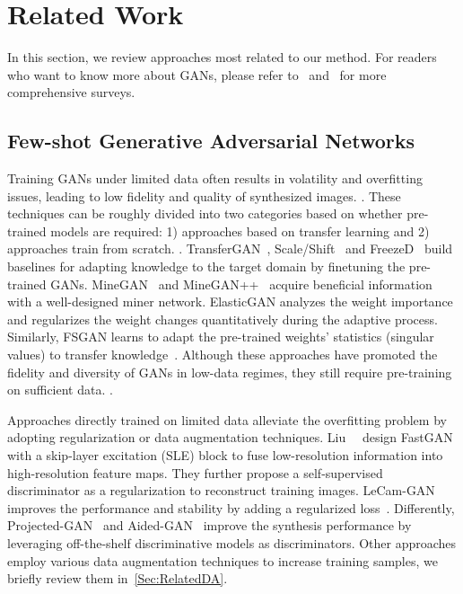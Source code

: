 \section{Related Work}
In this section, we review approaches most related to our method.
For readers who want to know more about GANs, please refer to~\cite{liu2021generative} and~\cite{Survey2021VAE} for more comprehensive surveys.

\subsection{Few-shot Generative Adversarial Networks}
Training GANs under limited data often results in volatility and overfitting issues, leading to low fidelity and quality of synthesized images.
%
.
%
These techniques can be roughly divided into two categories based on whether pre-trained models are required: 1) approaches based on transfer learning and 2) approaches train from scratch.
%
.
%
TransferGAN~\cite{wang2018transferring}, Scale/Shift~\cite{noguchi2019image} and FreezeD~\cite{mo2020freeze} build baselines for adapting knowledge to the target domain by finetuning the pre-trained GANs.
%
MineGAN~\cite{wang2020minegan} and MineGAN++~\cite{MineGAN++} acquire beneficial information with a well-designed miner network.
%
ElasticGAN\cite{li2020few} analyzes the weight importance and regularizes the weight changes quantitatively during the adaptive process.
%
Similarly, FSGAN learns to adapt the pre-trained weights' statistics (singular values) to transfer knowledge~\cite{robb2020few}.
Although these approaches have promoted the fidelity and diversity of GANs in low-data regimes, they still require pre-training on sufficient data.
.

Approaches directly trained on limited data alleviate the overfitting problem by adopting regularization or data augmentation techniques.
Liu~\etal~\cite{liu2021towards} design FastGAN with a skip-layer excitation (SLE) block to fuse low-resolution information into high-resolution feature maps. They further propose a self-supervised discriminator as a regularization to reconstruct training images.
LeCam-GAN improves the performance and stability by adding a regularized loss~\cite{tseng2021regularizing}.
Differently, Projected-GAN~\cite{projectedGAN} and Aided-GAN~\cite{kumari2022ensembling} improve the synthesis performance by leveraging off-the-shelf discriminative models as discriminators.
%
Other approaches employ various data augmentation techniques to increase training samples, we briefly review them in~\ref{Sec:RelatedDA}.

